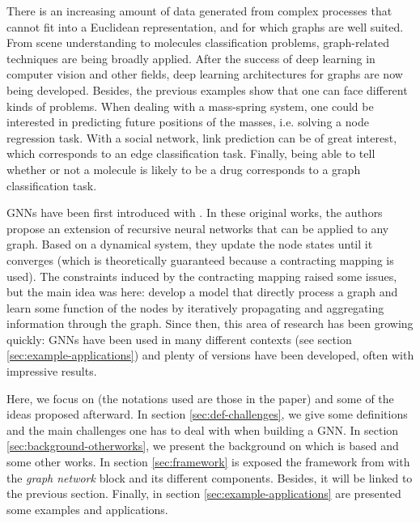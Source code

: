 \documentclass{article}
\begin{document}
There is an increasing amount of data generated from complex processes that cannot fit into a Euclidean representation, and for which graphs are well suited. From scene understanding to molecules classification problems, graph-related techniques are being broadly applied. After the success of deep learning in computer vision and other fields, deep learning architectures for graphs are now being developed. Besides, the previous examples show that one can face different kinds of problems. When dealing with a mass-spring system, one could be interested in predicting future positions of the masses, i.e. solving a node regression task. With a social network, link prediction can be of great interest, which corresponds to an edge classification task. Finally, being able to tell whether or not a molecule is likely to be a drug corresponds to a graph classification task.

GNNs have been first introduced with \cite[Gori et al. 2005]{gori2005GNN}. In these original works, the authors propose an extension of recursive neural networks that can be applied to any graph. Based on a dynamical system, they update the node states until it converges (which is theoretically guaranteed because a contracting mapping is used). The constraints induced by the contracting mapping raised some issues, but the main idea was here: develop a model that directly process a graph and learn some function of the nodes by iteratively propagating and aggregating information through the graph. Since then, this area of research has been growing quickly: GNNs have been used in many different contexts (see section \ref{sec:example-applications}) and plenty of versions have been developed, often with impressive results.

Here, we focus on \cite[Battaglia et al. 2018]{battaglia2018relational} (the notations used are those in the paper) and some of the ideas proposed afterward. In section \ref{sec:def-challenges}, we give some definitions and the main challenges one has to deal with when building a GNN. In section \ref{sec:background-otherworks}, we present the background on which \cite[Battaglia et al. 2018]{battaglia2018relational} is based and some other works. In section \ref{sec:framework} is exposed the framework from \cite[Battaglia et al. 2018]{battaglia2018relational} with the \emph{graph network} block and its different components. Besides, it will be linked to the previous section. Finally, in section \ref{sec:example-applications} are presented some examples and applications.
\end{document}

